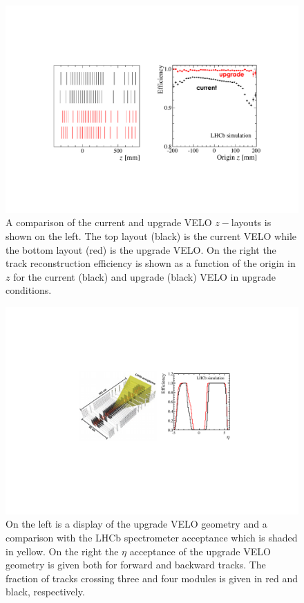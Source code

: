 \begin{figure}[t]
  \centerline{\includegraphics[width=\textwidth]{figures/lhcb_veloperf.pdf}}
  \caption{A comparison of the current and upgrade VELO $z-$layouts is shown on the left. The top layout (black) is the current VELO while the bottom layout (red) is the upgrade VELO. On the right the track reconstruction efficiency is shown as a function of the origin in $z$ for the current (black) and upgrade (black) VELO in upgrade conditions.}
  \label{fig:eff}
\end{figure}

\begin{figure}[h]
\centerline{\includegraphics[width=\textwidth]{figures/lhcb_veloacceptance2.pdf}}
  \caption{On the left is a display of the upgrade VELO geometry and a comparison with the LHCb spectrometer acceptance which is shaded in yellow. On the right the $\eta$ acceptance of the upgrade VELO geometry is given both for forward and backward tracks. The fraction of tracks crossing three and four modules is given in red and black, respectively.}
  \label{fig:ulhcb_veloacc}
\end{figure}

